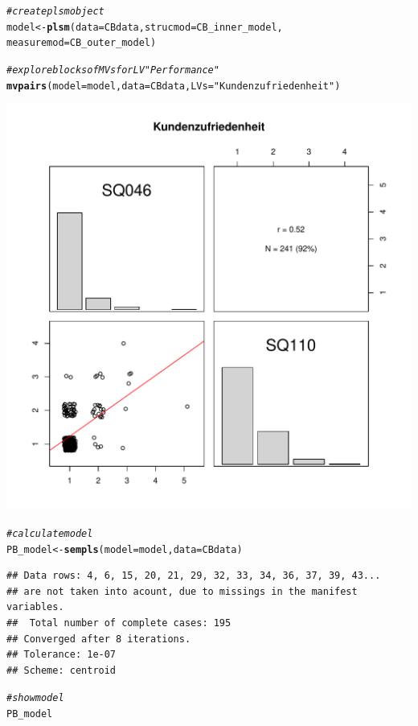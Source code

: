 \documentclass{article}\usepackage[]{graphicx}\usepackage[]{color}
\makeatletter
\def\maxwidth{ %
  \ifdim\Gin@nat@width>\linewidth
    \linewidth
  \else
    \Gin@nat@width
  \fi
}
\newcommand{\hlstr}[1]{\textcolor[rgb]{0.192,0.494,0.8}{#1}}%
\newcommand{\hlcom}[1]{\textcolor[rgb]{0.678,0.584,0.686}{\textit{#1}}}%
\newcommand{\hlstd}[1]{\textcolor[rgb]{0.345,0.345,0.345}{#1}}%
\newcommand{\hlkwb}[1]{\textcolor[rgb]{0.69,0.353,0.396}{#1}}%
\newcommand{\hlkwc}[1]{\textcolor[rgb]{0.333,0.667,0.333}{#1}}%
\newcommand{\hlkwd}[1]{\textcolor[rgb]{0.737,0.353,0.396}{\textbf{#1}}}%
\newenvironment{kframe}{%
 \def\at@end@of@kframe{}%
 \ifinner\ifhmode%
  \def\at@end@of@kframe{\end{minipage}}%
  \begin{minipage}{\columnwidth}%
 \fi\fi%
 \def\FrameCommand##1{\hskip\@totalleftmargin \hskip-\fboxsep
 \colorbox{shadecolor}{##1}\hskip-\fboxsep
     \hskip-\linewidth \hskip-\@totalleftmargin \hskip\columnwidth}%
 \MakeFramed {\advance\hsize-\width
   \@totalleftmargin\z@ \linewidth\hsize
   \@setminipage}}%
 {\par\unskip\endMakeFramed%
 \at@end@of@kframe}
\newenvironment{knitrout}{}{} %
\makeatother
\begin{document}
\begin{knitrout}
\begin{kframe}
\begin{alltt}
\hlcom{#create plsm object }
\hlstd{model} \hlkwb{<-} \hlkwd{plsm}\hlstd{(}\hlkwc{data} \hlstd{= CBdata,} \hlkwc{strucmod} \hlstd{= CB_inner_model,}
              \hlkwc{measuremod} \hlstd{= CB_outer_model)}

\hlcom{#explore blocks of MVs for LV "Performance"}
\hlkwd{mvpairs}\hlstd{(}\hlkwc{model} \hlstd{= model,} \hlkwc{data} \hlstd{= CBdata,} \hlkwc{LVs} \hlstd{=} \hlstr{"Kundenzufriedenheit"}\hlstd{)}
\end{alltt}
\end{kframe}
\includegraphics[width=\maxwidth]{figure/semPLS-1} 
\begin{kframe}\begin{alltt}
\hlcom{#calculate model}
\hlstd{PB_model} \hlkwb{<-} \hlkwd{sempls}\hlstd{(}\hlkwc{model} \hlstd{= model,}\hlkwc{data} \hlstd{= CBdata)}
\end{alltt}
\begin{verbatim}
## Data rows: 4, 6, 15, 20, 21, 29, 32, 33, 34, 36, 37, 39, 43... 
## are not taken into acount, due to missings in the manifest variables.
##  Total number of complete cases: 195 
## Converged after 8 iterations.
## Tolerance: 1e-07
## Scheme: centroid
\end{verbatim}
\begin{alltt}
\hlcom{#show model}
\hlstd{PB_model}
\end{alltt}

\end{kframe}
\end{knitrout}
\end{document}
